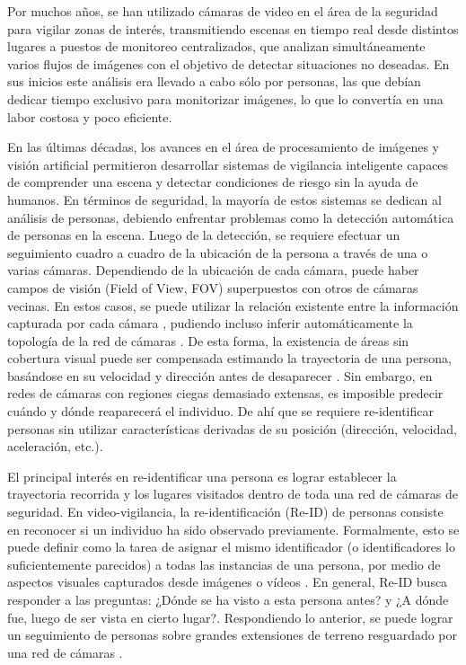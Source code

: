 \documentclass[../memoria.tex]{subfiles}
\begin{document}
\label{introduccion}

Por muchos años, se han utilizado cámaras de video en el área de la seguridad para vigilar zonas de interés, transmitiendo escenas en tiempo real desde distintos lugares a puestos de monitoreo centralizados, que analizan simultáneamente varios flujos de imágenes con el objetivo de detectar situaciones no deseadas. En sus inicios este análisis era llevado a cabo sólo por personas, las que debían dedicar tiempo exclusivo para monitorizar imágenes, lo que lo convertía en una labor costosa y poco eficiente.

En las últimas décadas, los avances en el área de procesamiento de imágenes y visión artificial permitieron desarrollar sistemas de vigilancia inteligente capaces de comprender una escena y detectar condiciones de riesgo sin la ayuda de humanos. En términos de seguridad, la mayoría de estos sistemas se dedican al análisis de personas, debiendo enfrentar problemas como la detección automática de personas en la escena. Luego de la detección, se requiere efectuar un seguimiento cuadro a cuadro de la ubicación de la persona a través de una o varias cámaras. Dependiendo de la ubicación de cada cámara, puede haber campos de visión (Field of View, FOV) superpuestos con otros de cámaras vecinas. En estos casos, se puede utilizar la relación existente entre la información capturada por cada cámara \cite{gilbert2006tracking, porikli2003multi}, pudiendo incluso inferir automáticamente la topología de la red de cámaras \cite{stein1999tracking, ellis2003learning}. De esta forma, la existencia de áreas sin cobertura visual puede ser compensada estimando la trayectoria de una persona, basándose en su velocidad y dirección antes de desaparecer \cite{bouma2013real}. Sin embargo, en redes de cámaras con regiones ciegas demasiado extensas, es imposible predecir cuándo y dónde reaparecerá el individuo. De ahí que se requiere re-identificar personas sin utilizar características derivadas de su posición (dirección, velocidad, aceleración, etc.). %

El principal interés en re-identificar una persona es lograr establecer la trayectoria recorrida y los lugares visitados dentro de toda una red de cámaras de seguridad. En video-vigilancia, la re-identificación (Re-ID) de personas consiste en reconocer si un individuo ha sido observado previamente. Formalmente, esto se puede definir como la tarea de asignar el mismo identificador (o identificadores lo suficientemente parecidos) a todas las instancias de una persona, por medio de aspectos visuales capturados desde imágenes o vídeos \cite{vezzani2013people}. En general, Re-ID busca responder a las preguntas: ¿Dónde se ha visto a esta persona antes? y ¿A dónde fue, luego de ser vista en cierto lugar?. Respondiendo lo anterior, se puede lograr un seguimiento de personas sobre grandes extensiones de terreno resguardado por una red de cámaras \cite{bouma2013real}.
\end{document}
